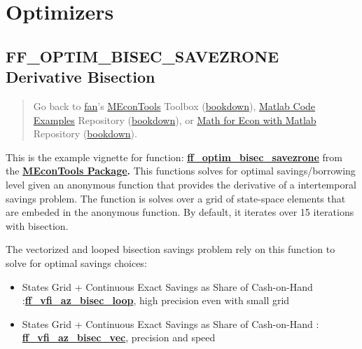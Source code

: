 \documentclass[
]{book}
\begin{document}
\hypertarget{optimizers}{%
\chapter{Optimizers}\label{optimizers}}

\hypertarget{ff_optim_bisec_savezrone-derivative-bisection}{%
\section{FF\_OPTIM\_BISEC\_SAVEZRONE Derivative Bisection}\label{ff_optim_bisec_savezrone-derivative-bisection}}

\begin{quote}
Go back to \href{http://fanwangecon.github.io/}{fan}'s \href{https://fanwangecon.github.io/MEconTools/}{MEconTools} Toolbox (\href{https://fanwangecon.github.io/MEconTools/bookdown}{bookdown}), \href{https://fanwangecon.github.io/M4Econ/}{Matlab Code Examples} Repository (\href{https://fanwangecon.github.io/M4Econ/bookdown}{bookdown}), or \href{https://fanwangecon.github.io/Math4Econ/}{Math for Econ with Matlab} Repository (\href{https://fanwangecon.github.io/Math4Econ/bookdown}{bookdown}).
\end{quote}

This is the example vignette for function:
\href{https://github.com/FanWangEcon//MEconTools/blob/master/MEconTools/optim/ff_optim_bisec_savezrone.m}{\textbf{ff\_optim\_bisec\_savezrone}}
from the \href{https://fanwangecon.github.io/MEconTools/}{\textbf{MEconTools
Package}}\textbf{.} This
functions solves for optimal savings/borrowing level given an anonymous
function that provides the derivative of a intertemporal savings
problem. The function is solves over a grid of state-space elements that
are embeded in the anonymous function. By default, it iterates over 15
iterations with bisection.

The vectorized and looped bisection savings problem rely on this
function to solve for optimal savings choices:

\begin{itemize}
\item
  States Grid + Continuous Exact Savings as Share of Cash-on-Hand :\href{https://github.com/FanWangEcon/MEconTools/blob/master/MEconTools/vfi/ff_vfi_az_bisec_loop.m}{\textbf{ff\_vfi\_az\_bisec\_loop}},
  high precision even with small grid
\item
  States Grid + Continuous Exact Savings as Share of Cash-on-Hand :
  \href{https://github.com/FanWangEcon/MEconTools/blob/master/MEconTools/vfi/ff_vfi_az_bisec_vec.m}{\textbf{ff\_vfi\_az\_bisec\_vec}},
  precision and speed
\end{itemize}
\end{document}
